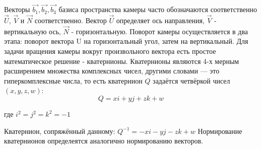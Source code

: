  Векторы \begin{math}\vec{b_1}, \vec{b_2},\vec{b_3}\end{math} базиса пространства камеры часто обозначаются соответственно \begin{math}\vec{U}\end{math}, \begin{math}\vec{V}\end{math} и \begin{math}\vec{N}\end{math} соответственно. Вектор \begin{math}\vec{U}\end{math} определяет ось направления, \begin{math}\vec{V}\end{math} - вертикальную ось, \begin{math}\vec{N}\end{math} - горизонтальную.
  Поворот камеры осуществляется в два этапа: поворот вектора U на горизонтальный угол, затем на вертикальный.  
  Для задачи вращения камеры вокруг произвольного вектора есть простое математическое решение - кватернионы. 
   Кватернионы являются 4-х мерным расширением множества комплексных чисел, другими словами ---  это гиперкомплексные числа,  
   то есть кватернион \begin{math}Q\end{math} задаётся четвёркой чисел \begin{math}(x, y, z, w)\end{math}:
   \begin{equation}Q = xi + yj +zk + w\end{equation}
   \begin{eqrem}
    где \begin{math}i^2 = j^2 = k^2 = -1\end{math}
   \end{eqrem}

  Кватернион, сопряжённый данному: \begin{math}Q^{-1} = -xi - yj - zk + w\end{math}
  Нормирование кватернионов определеятся аналогично нормированию векторов.
  

